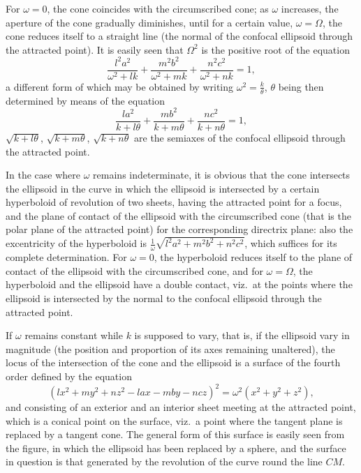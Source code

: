 \documentclass[11pt,a4paper]{book}
\begin{document}
\newpage

\setcounter{page}{433}

For $\omega = 0$, the cone coincides with the circumscribed cone; as $\omega$ increases, the aperture of the cone gradually diminishes, until for a certain value, $\omega = \Omega$, the cone reduces itself to a straight line (the normal of the confocal ellipsoid through the attracted point). It is easily seen that $\Omega^{2}$ is the positive root of the equation
\[
\frac{l^{2}a^{2}}{\omega^{2} + lk} + \frac{m^{2}b^{2}}{\omega^{2} + mk} + \frac{n^{2}c^{2}}{\omega^{2} + nk} = 1,
\]
a different form of which may be obtained by writing $\omega^{2} = \frac{k}{\theta}$, $\theta$ being then determined by means of the equation
\[
\frac{la^{2}}{k + l\theta} + \frac{mb^{2}}{k + m\theta} + \frac{nc^{2}}{k + n\theta} = 1,
\]
$\sqrt{k + l\theta}$, $\sqrt{k + m\theta}$, $\sqrt{k + n\theta}$ are the semiaxes of the confocal ellipsoid through the attracted point.

In the case where $\omega$ remains indeterminate, it is obvious that the cone intersects the ellipsoid in the curve in which the ellipsoid is intersected by a certain hyperboloid of revolution of two sheets, having the attracted point for a focus, and the plane of contact of the ellipsoid with the circumscribed cone (that is the polar plane of the attracted point) for the corresponding directrix plane: also the excentricity of the hyperboloid is $\frac{1}{\omega}\sqrt{l^{2}a^{2} + m^{2}b^{2} + n^{2}c^{2}}$, which suffices for its complete determination. For $\omega = 0$, the hyperboloid reduces itself to the plane of contact of the ellipsoid with the circumscribed cone, and for $\omega = \Omega$, the hyperboloid and the ellipsoid have a double contact, viz.\ at the points where the ellipsoid is intersected by the normal to the confocal ellipsoid through the attracted point.

If $\omega$ remains constant while $k$ is supposed to vary, that is, if the ellipsoid vary in magnitude (the position and proportion of its axes remaining unaltered), the locus of the intersection of the cone and the ellipsoid is a surface of the fourth order defined by the equation
\[
(lx^{2} + my^{2} + nz^{2} - lax - mby - ncz)^{2} = \omega^{2}(x^{2} + y^{2} + z^{2}),
\]
and consisting of an exterior and an interior sheet meeting at the attracted point, which is a conical point on the surface, viz.\ a point where the tangent plane is replaced by a tangent cone. The general form of this surface is easily seen from the figure, in which the ellipsoid has been replaced by a sphere, and the surface in question is that generated by the revolution of the curve round the line $CM$.
\end{document}
